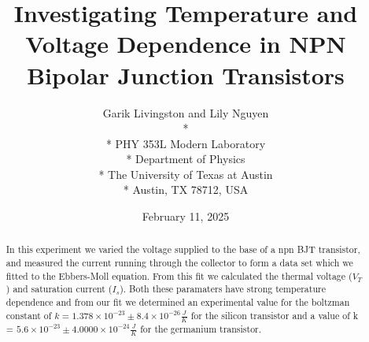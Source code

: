 \documentclass[12pt,letterpaper,onecolumn]{article}
\begin{document}

\title{Investigating Temperature and Voltage Dependence in NPN Bipolar Junction Transistors}

\author{
 Garik Livingston and Lily Nguyen \\*
  \\*
 PHY 353L Modern Laboratory \\*
 Department of Physics \\*
 The University of Texas at Austin \\*
 Austin, TX 78712, USA
}
\date{February 11, 2025}


\maketitle


\begin{abstract}
	In this experiment we varied the voltage supplied to the base of a npn BJT transistor, and measured the current running through the collector to form a data set which we fitted to the Ebbers-Moll equation.
	From this fit we calculated the thermal voltage ($V_T$) and saturation current ($I_s$). Both these paramaters have strong temperature dependence and from our fit we determined an experimental value for the boltzman constant of $k = 1.378 \times 10^{-23} \pm 8.4 \times 10^{-26} \frac{J}{K}$ for the silicon transistor and a value of k = $5.6 \times 10^{-23}\pm 4.0000 \times 10^{-24} \frac{J}{K}$ for the germanium transistor. 
	
\end{abstract}

\end{document}
